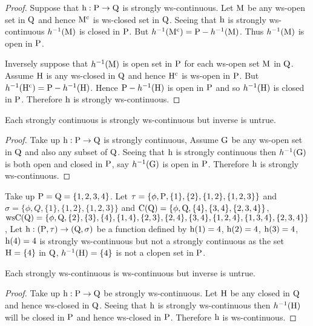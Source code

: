 \begin{proof}
Suppose that $\mathrm{h}: \mathrm{P}\to \mathrm{Q}$ is strongly ws-continuous. Let $\mathrm{M}$ be any ws-open set in $\mathrm{Q}$ and hence $\mathrm{M}^{\text{c}}$ is ws-closed set in $\mathrm{Q}$. Seeing that $\mathrm{h}$ is strongly ws-continuous $h^{-1}(\mathrm{M})$ is closed in $\mathrm{P}$. But $h^{-1} (\mathrm{M}^{\text{c}}) =\mathrm{P} - h^{-1} (\mathrm{M})$. Thus $h^{-1}(\mathrm{M})$ is open in $\mathrm{P}$.

Inversely suppose that $h^{-1}(\mathrm{M})$ is open set in $\mathrm{P}$ for each ws-open set $\mathrm{M}$ in $\mathrm{Q}$. Assume $\mathrm{H}$ is any ws-closed in $\mathrm{Q}$ and hence $\mathrm{H}^{\text{c}}$ is ws-open in $\mathrm{P}$. But $h^{-1}(\mathrm{H}^{\text{c}}) =\mathrm{P} -h^{-1} (\mathrm{H})$. Hence $\mathrm{P}-h^{-1} (\mathrm{H})$ is open in $\mathrm{P}$ and so $h^{-1}(\mathrm{H})$ is closed in $\mathrm{P}$. Therefore $\mathrm{h}$ is strongly ws-continuous.
\end{proof}

\begin{thm}\label{thm3.3.9}
Each strongly continuous is strongly ws-continuous but inverse is untrue.
\end{thm}

\begin{proof}
Take up $\mathrm{h}: \mathrm{P}\to \mathrm{Q}$ is strongly continuous, Assume $\mathrm{G}$ be any ws-open set in $\mathrm{Q}$ and also any subset of $\mathrm{Q}$. Seeing that $\mathrm{h}$ is strongly continuous then $h^{-1}(\mathrm{G})$ is both open and closed in $\mathrm{P}$, say $h^{-1}(\mathrm{G})$ is open in $\mathrm{P}$. Therefore $\mathrm{h}$ is strongly ws-continuous.
\end{proof}

\begin{exm}\label{exam3.3.5}
Take up $\mathrm{P}=\mathrm{Q}= \{1, 2, 3, 4\}$. Let $\tau = \{\phi, \TSP, \{1\}, \{2\}, \{1, 2\},\break \{1,2,3\}\}$ and $\sigma =\{\phi, Q, \{1\}, \{1,2\}, \{1,2,3\}\}$ and $\mathrm{C}(\mathrm{Q})= \{\phi, \mathrm{Q},\{4\},\{3,4\},\{2,3,4\}\}$, $\mathrm{ws}\mathrm{C}(\mathrm{Q})= \{\phi,\mathrm{Q},\{2\},\{3\}, \{4\},\{1,4\},\{2,3\},\{2,4\}, \{3,4\}, \{1,2,4\},\{1,3,4\},\{2,3,4\}\}$, Let $\mathrm{h}: (\mathrm{P}, \tau)\to (\mathrm{Q}, \sigma)$ be a function defined by $\mathrm{h}(1)=4$, $\mathrm{h}(2)=4$, $\mathrm{h}(3)=4$, $\mathrm{h}(4)=4$ is strongly ws-continuous but not a strongly continuous as the set $\mathrm{H}=\{4\}$ in $\mathrm{Q}$, $h^{-1}(\mathrm{H})=\{4\}$ is not a clopen set in $\mathrm{P}$.
\end{exm}

\begin{thm}\label{thm3.3.10}
Each strongly ws-continuous is ws-continuous but inverse is untrue.
\end{thm}

\begin{proof}
Take up $\mathrm{h}: \mathrm{P}\to \mathrm{Q}$ be strongly ws-continuous. Let $\mathrm{H}$ be any closed in $\mathrm{Q}$ and hence ws-closed in $\mathrm{Q}$. Seeing that $\mathrm{h}$ is strongly ws-continuous then $h^{-1}(\mathrm{H})$ will be closed in $\mathrm{P}$ and hence ws-closed in $\mathrm{P}$. Therefore $\mathrm{h}$ is ws-continuous.
\end{proof}

